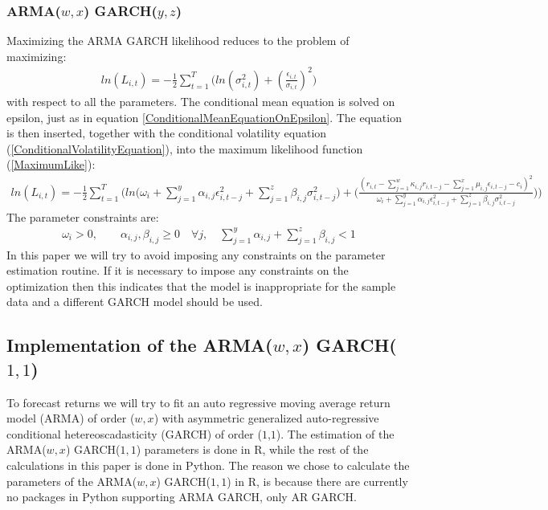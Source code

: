 \subsubsection{ARMA($w,x$) GARCH($y,z$)}
Maximizing the ARMA GARCH likelihood reduces to the problem of maximizing:
\begin{align} 
    ln(L_{i,t})=-\frac{1}{2}\sum_{t=1}^T\bigg( ln(\sigma_{i,t}^2)+(\frac{\epsilon_{i,t}}{\sigma_{i,t}})^2\bigg)   \label{MaximumLike}
\end{align}
with respect to all the parameters. The conditional mean equation is solved on epsilon, just as in equation \ref{ConditionalMeanEquationOnEpsilon}. The equation is then inserted, together with the conditional volatility equation (\ref{ConditionalVolatilityEquation}), into the maximum likelihood function (\ref{MaximumLike}):
\begin{align} 
    ln(L_{i,t})=-\frac{1}{2}\sum_{t=1}^T \Bigg(ln\Big(\omega_i + \sum_{j=1}^y\alpha_{i,j}\epsilon_{i,t-j}^2+\sum_{j=1}^z\beta_{i,j}\sigma_{i,t-j}^2\big)+\Big(\frac{(r_{i,t}-\sum_{j=1}^w\kappa_{i,j} r_{i,t-j}-\sum_{j=1}^x\mu_{i,j} \epsilon_{i,t-j}-c_i)^2}{\omega_i + \sum_{j=1}^y \alpha_{i,j} \epsilon_{i,t-j}^2 +\sum_{j=1}^z\beta_{i,j}\sigma_{i,t-j}^2}\Big)\Bigg)   \label{fullMaximumLike}
\end{align}
The parameter constraints are:
\begin{align} 
    \omega_i>0,\quad\quad \alpha_{i,j},\beta_{i,j}\geq0 \quad \forall j, \quad \sum_{j=1}^y\alpha_{i,j}+\sum_{j=1}^z\beta_{i,j}<1 \label{ParameterConstraints}
\end{align}
In this paper we will try to avoid imposing any constraints on the parameter estimation routine. If it is necessary to impose any constraints on the optimization then this indicates that the model is inappropriate for the sample data and a different GARCH model should be used.

\subsection*{Implementation of the ARMA($w,x$) GARCH($1,1$)}
To forecast returns we will try to fit an auto regressive moving average return model (ARMA) of order ($w,x$) with asymmetric generalized auto-regressive conditional hetereoscadasticity (GARCH) of order ($1$,$1$). The estimation of the ARMA($w,x$) GARCH($1,1$) parameters is done in R, while the rest of the calculations in this paper is done in Python. The reason we chose to calculate the parameters of the ARMA($w,x$) GARCH($1,1$) in R, is because there are currently no packages in Python supporting ARMA GARCH, only AR GARCH. 

